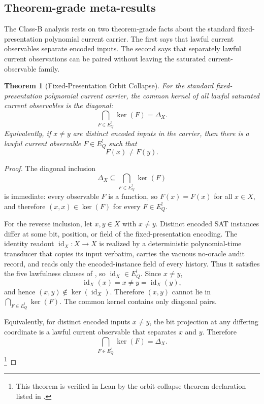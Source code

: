 \documentclass[11pt]{article}
\newcommand{\EQbang}{E^{!}_{Q}}
\newtheorem{theorem}{Theorem}[section]
\theoremstyle{definition}
\begin{document}
\subsection{Theorem-grade meta-results}
\label{subsec:class-b:meta-results}

The Class-B analysis rests on two theorem-grade facts about the
standard fixed-presentation polynomial current carrier.  The first says
that lawful current observables separate encoded inputs.  The second
says that separately lawful current observations can be paired without
leaving the saturated current-observable family.

\begin{theorem}[Fixed-Presentation Orbit Collapse]
\label{thm:pvnp:orbit-collapse}
For the standard fixed-presentation polynomial current carrier, the
common kernel of all lawful saturated current observables is the
diagonal:
\[
  \bigcap_{F\in\EQbang}\ker(F)=\Delta_{X}.
\]
Equivalently, if \(x\neq y\) are distinct encoded inputs in the carrier,
then there is a lawful current observable \(F\in\EQbang\) such that
\[
  F(x)\neq F(y).
\]
\end{theorem}

\begin{proof}
The diagonal inclusion
\[
  \Delta_X\subseteq \bigcap_{F\in\EQbang}\ker(F)
\]
is immediate: every observable \(F\) is a function, so \(F(x)=F(x)\)
for all \(x\in X\), and therefore \((x,x)\in\ker(F)\) for every
\(F\in\EQbang\).

For the reverse inclusion, let \(x,y\in X\) with \(x\neq y\).  Distinct
encoded SAT instances differ at some bit, position, or field of the
fixed-presentation encoding.  The identity readout
\(\operatorname{id}_{X}:X\to X\) is realized by a deterministic
polynomial-time transducer that copies its input verbatim, carries the
vacuous no-oracle audit record, and reads only the encoded-instance
field of every history.  Thus it satisfies the five lawfulness clauses
of , so
\(\operatorname{id}_{X}\in\EQbang\).  Since \(x\neq y\),
\[
  \operatorname{id}_{X}(x)=x\neq y=\operatorname{id}_{X}(y),
\]
and hence \((x,y)\notin\ker(\operatorname{id}_{X})\).  Therefore
\((x,y)\) cannot lie in \(\bigcap_{F\in\EQbang}\ker(F)\).  The common
kernel contains only diagonal pairs.

Equivalently, for distinct encoded inputs \(x\neq y\), the bit
projection at any differing coordinate is a lawful current observable
that separates \(x\) and \(y\).  Therefore
\[
  \bigcap_{F\in\EQbang}\ker(F)=\Delta_X .
\]\footnote{This theorem is verified in Lean by
the orbit-collapse theorem declaration listed in
.}
\end{proof}
\end{document}
